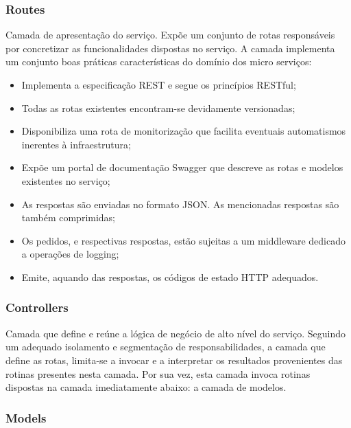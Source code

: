 \subsubsection{Routes}

Camada de apresentação do serviço. Expõe um conjunto de rotas responsáveis por concretizar as funcionalidades dispostas no serviço. A camada implementa um conjunto boas práticas características do domínio dos micro serviços:

\begin{itemize}
    \item Implementa a especificação REST e segue os princípios RESTful;
    
    \item Todas as rotas existentes encontram-se devidamente versionadas;
    
    \item Disponibiliza uma rota de monitorização que facilita eventuais automatismos inerentes à infraestrutura;
    
    \item Expõe um portal de documentação Swagger que descreve as rotas e modelos existentes no serviço;
    
    \item As respostas são enviadas no formato JSON. As mencionadas respostas são também comprimidas;
    
    \item Os pedidos, e respectivas respostas, estão sujeitas a um middleware dedicado a operações de logging;
    
    \item Emite, aquando das respostas, os códigos de estado HTTP adequados.
\end{itemize}

\subsubsection{Controllers}

Camada que define e reúne a lógica de negócio de alto nível do serviço. Seguindo um adequado isolamento e segmentação de responsabilidades, a camada que define as rotas, limita-se a invocar e a interpretar os resultados provenientes das rotinas presentes nesta camada. Por sua vez, esta camada invoca rotinas dispostas na camada imediatamente abaixo: a camada de modelos.

\subsubsection{Models}

